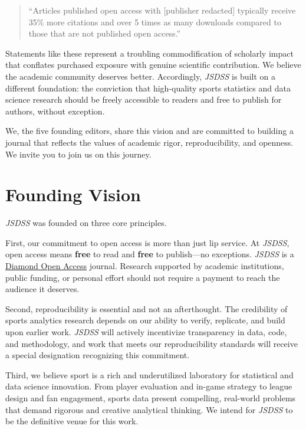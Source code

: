 \documentclass[
  12pt]{article}
\begin{document}
\begin{quote}
``Articles published open access with {[}publisher redacted{]} typically
receive 35\% more citations and over 5 times as many downloads compared
to those that are not published open access.''
\end{quote}

Statements like these represent a troubling commodification of scholarly
impact that conflates purchased exposure with genuine scientific
contribution. We believe the academic community deserves better.
Accordingly, \emph{JSDSS} is built on a different foundation: the
conviction that high-quality sports statistics and data science research
should be freely accessible to readers and free to publish for authors,
without exception.

We, the five founding editors, share this vision and are committed to
building a journal that reflects the values of academic rigor,
reproducibility, and openness. We invite you to join us on this journey.

\section{Founding Vision}\label{founding-vision}

\emph{JSDSS} was founded on three core principles.

First, our commitment to open access is more than just lip service. At
\emph{JSDSS}, open access means \textbf{free} to read and \textbf{free}
to publish---no exceptions. \emph{JSDSS} is a
\href{https://en.wikipedia.org/wiki/Diamond_open_access}{Diamond Open
Access} journal. Research supported by academic institutions, public
funding, or personal effort should not require a payment to reach the
audience it deserves.

Second, reproducibility is essential and not an afterthought. The
credibility of sports analytics research depends on our ability to
verify, replicate, and build upon earlier work. \emph{JSDSS} will
actively incentivize transparency in data, code, and methodology, and
work that meets our reproducibility standards will receive a special
designation recognizing this commitment.

Third, we believe sport is a rich and underutilized laboratory for
statistical and data science innovation. From player evaluation and
in-game strategy to league design and fan engagement, sports data
present compelling, real-world problems that demand rigorous and
creative analytical thinking. We intend for \emph{JSDSS} to be the
definitive venue for this work.
\end{document}
